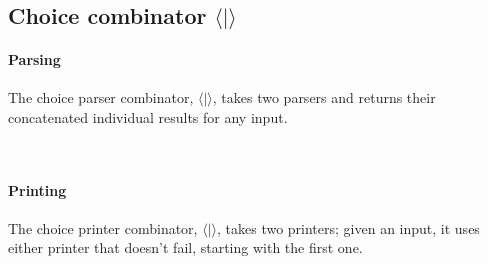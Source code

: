 \documentclass[12pt,a4paper,twoside,openright]{report}
\begin{document}
\begin{code}
\>[0] \AgdaSymbol{:} \AgdaSymbol{\{} \AgdaSymbol{:} \AgdaSymbol{\}}   \<%
\\
\>[4] \AgdaSymbol{=}     \AgdaSymbol{)}\<%
\end{code}

\subsection{Choice combinator $\langle|\rangle$}

\paragraph{Parsing}
{The choice parser combinator, $\langle | \rangle$, takes two parsers and returns their concatenated individual results for any input}.

\begin{code}
\> \AgdaSymbol{:} \AgdaSymbol{\{} \AgdaSymbol{:} \AgdaSymbol{\}}         \<%
\\
\>     \AgdaSymbol{=}       \AgdaFunction{++}  \AgdaSymbol{)}\<%
\end{code}

\paragraph{Printing}
{The choice printer combinator, $\langle | \rangle$, takes two printers; given an input, it uses either printer that doesn't fail, starting with the first one}.

\begin{code}
\> \AgdaSymbol{:} \AgdaSymbol{\{} \AgdaSymbol{:} \AgdaSymbol{\}}         \<%
\\
\>     \AgdaSymbol{=}      \AgdaSymbol{(} \AgdaSymbol{)} \AgdaSymbol{(} \AgdaSymbol{))}\<%
\end{code}
\end{document}
